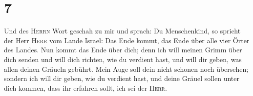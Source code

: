 \hypertarget{section-6}{%
\section{7}\label{section-6}}

 Und des \textsc{Herrn} Wort geschah zu mir und sprach:
 Du Menschenkind, so spricht der Herr \textsc{Herr} vom
Lande Israel: Das Ende kommt, das Ende über alle vier Örter des Landes.
 Nun kommt das Ende über dich; denn ich will meinen Grimm
über dich senden und will dich richten, wie du verdient hast, und will
dir geben, was allen deinen Gräueln gebührt.  Mein Auge
soll dein nicht schonen noch übersehen; sondern ich will dir geben, wie
du verdient hast, und deine Gräuel sollen unter dich kommen, dass ihr
erfahren sollt, ich sei der \textsc{Herr}.

